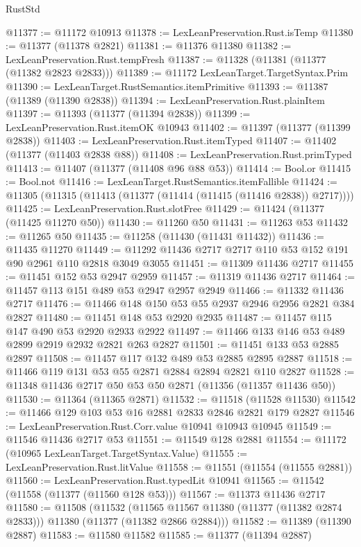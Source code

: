 \begin{lexlean}{RustStd}
\begin{coremodule}
@11377 := @11172 @10913
@11378 := LexLeanPreservation.Rust.isTemp
@11380 := @11377 (@11378 @2821)
@11381 := @11376 @11380
@11382 := LexLeanPreservation.Rust.tempFresh
@11387 := @11328 (@11381 (@11377 (@11382 @2823 @2833)))
@11389 := @11172 LexLeanTarget.TargetSyntax.Prim
@11390 := LexLeanTarget.RustSemantics.itemPrimitive
@11393 := @11387 (@11389 (@11390 @2838))
@11394 := LexLeanPreservation.Rust.plainItem
@11397 := @11393 (@11377 (@11394 @2838))
@11399 := LexLeanPreservation.Rust.itemOK @10943
@11402 := @11397 (@11377 (@11399 @2838))
@11403 := LexLeanPreservation.Rust.itemTyped
@11407 := @11402 (@11377 (@11403 @2838 @88))
@11408 := LexLeanPreservation.Rust.primTyped
@11413 := @11407 (@11377 (@11408 @96 @88 @53))
@11414 := Bool.or
@11415 := Bool.not
@11416 := LexLeanTarget.RustSemantics.itemFallible
@11424 := @11305 (@11315 (@11413 (@11377 (@11414 (@11415 (@11416 @2838)) @2717))))
@11425 := LexLeanPreservation.Rust.slotFree
@11429 := @11424 (@11377 (@11425 @11270 @50))
@11430 := @11260 @50
@11431 := @11263 @53
@11432 := @11265 @50
@11435 := @11258 (@11430 (@11431 @11432))
@11436 := @11435 @11270
@11449 := @11292 @11436 @2717 @2717 @110 @53 @152 @191 @90 @2961 @110 @2818 @3049 @3055
@11451 := @11309 @11436 @2717
@11455 := @11451 @152 @53 @2947 @2959
@11457 := @11319 @11436 @2717
@11464 := @11457 @113 @151 @489 @53 @2947 @2957 @2949
@11466 := @11332 @11436 @2717
@11476 := @11466 @148 @150 @53 @55 @2937 @2946 @2956 @2821 @384 @2827
@11480 := @11451 @148 @53 @2920 @2935
@11487 := @11457 @115 @147 @490 @53 @2920 @2933 @2922
@11497 := @11466 @133 @146 @53 @489 @2899 @2919 @2932 @2821 @263 @2827
@11501 := @11451 @133 @53 @2885 @2897
@11508 := @11457 @117 @132 @489 @53 @2885 @2895 @2887
@11518 := @11466 @119 @131 @53 @55 @2871 @2884 @2894 @2821 @110 @2827
@11528 := @11348 @11436 @2717 @50 @53 @50 @2871 (@11356 (@11357 @11436 @50))
@11530 := @11364 (@11365 @2871)
@11532 := @11518 (@11528 @11530)
@11542 := @11466 @129 @103 @53 @16 @2881 @2833 @2846 @2821 @179 @2827
@11546 := LexLeanPreservation.Rust.Corr.value @10941 @10943 @10945
@11549 := @11546 @11436 @2717 @53
@11551 := @11549 @128 @2881
@11554 := @11172 (@10965 LexLeanTarget.TargetSyntax.Value)
@11555 := LexLeanPreservation.Rust.litValue
@11558 := @11551 (@11554 (@11555 @2881))
@11560 := LexLeanPreservation.Rust.typedLit @10941
@11565 := @11542 (@11558 (@11377 (@11560 @128 @53)))
@11567 := @11373 @11436 @2717
@11580 := @11508
    (@11532
      (@11565 @11567 @11380 (@11377 (@11382 @2874 @2833)))
      @11380
      (@11377 (@11382 @2866 @2884)))
@11582 := @11389 (@11390 @2887)
@11583 := @11580 @11582
@11585 := @11377 (@11394 @2887)

\end{coremodule}
\end{lexlean}
